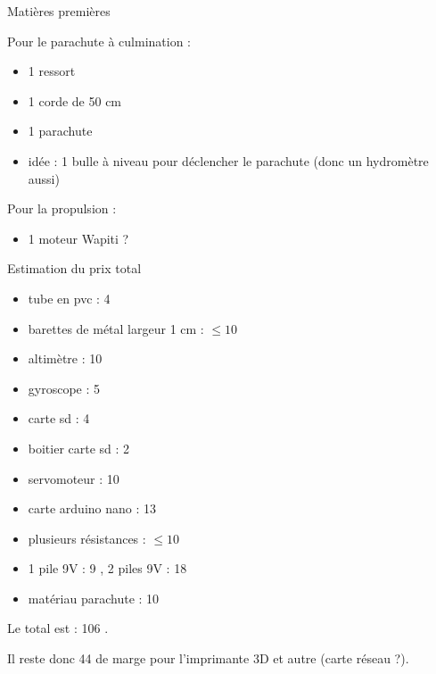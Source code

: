 \documentclass{beamer}
\begin{document}
	\begin{frame}{Matières premières}

		\fontsize{6}{12}\selectfont
		

                Pour le parachute à culmination :
                \begin{itemize}

                        \item 1 ressort
                        \item 1 corde de 50 cm
                        \item 1 parachute
                        \item idée : 1 bulle à niveau pour déclencher le parachute (donc un hydromètre aussi)
                \end{itemize}



                Pour la propulsion :

                \begin{itemize}

                        \item 1 moteur Wapiti ?
                \end{itemize}

	\end{frame}
	
	
	\begin{frame}{Estimation du prix total}
		
		\fontsize{6}{12}\selectfont

		\begin{itemize}

			\item tube en pvc : 4 \texteuro{}
			\item barettes de métal largeur 1 cm : $\leq 10$ \texteuro{}
			\item altimètre : 10 \texteuro{}
			\item gyroscope : 5 \texteuro{}
			\item carte sd : 4 \texteuro{}
			\item boitier carte sd : 2 \texteuro{}
			\item servomoteur : 10 \texteuro{}
			\item carte arduino nano : 13 \texteuro{}
			\item plusieurs résistances : $\leq 10$ \texteuro{}
			\item 1 pile 9V : 9 \texteuro{}, 2 piles 9V : 18 \texteuro{}
			\item matériau parachute : 10 \texteuro{}
		\end{itemize}


		Le total est : 106 \texteuro{}.


		Il reste donc 44 \texteuro{} de marge pour l'imprimante 3D et autre (carte réseau ?).
	\end{frame}
	

	\begin{frame}

		
	
		
	\end{frame}
\end{document}
